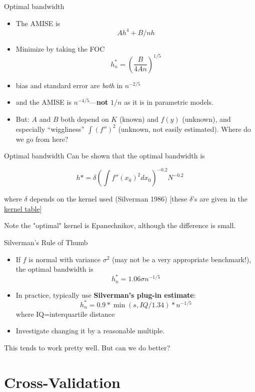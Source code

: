\begin{frame}{Optimal bandwidth}
  \begin{itemize}
  \item The AMISE is $$Ah^4+B/nh$$
  \item Minimize by taking the FOC 
    $$h^*_n=\left(\frac{B}{4An}\right)^{1/5}$$
  
  \item bias and standard error are \emph{both} in $n^{-2/5}$
  \item and the AMISE is $n^{-4/5}$---{\bf not} $1/n$ as it is in parametric models.
  
  \item But: $A$ and $B$ both depend on $K$ (known) and $f(y)$ (unknown), and
  especially ``wiggliness''
  $\int (f'')^2$ (unknown, not easily estimated). Where do we go from here? 
  \end{itemize}
\end{frame}

\begin{frame}{Optimal bandwidth}
  Can be shown that the optimal bandwidth is 
  
  $$h* = \delta \left( \int f''(x_0)^2dx_0\right)^{-0.2}N^{-0.2} $$

  where $\delta$ depends on the kernel used (Silverman 1986) [these $\delta$'s are given in the \href{fig:kernels}{kernel table}]

  Note the "optimal" kernel is Epanechnikov, although the difference is small. 

\end{frame}

\begin{frame}{Silverman's Rule of Thumb}
  \begin{itemize}
  \item If $f$ is normal with variance $\sigma^2$ (may not be a very appropriate benchmark!), the optimal bandwidth
  is
  $$h^*_n=1.06 \sigma n^{-1/5}$$
  \item In practice, typically use \textbf{Silverman's plug-in estimate}:
  $$h^*_n=0.9*\min(s,IQ/1.34)*n^{-1/5}$$ 
  where IQ=interquartile distance
  \item Investigate changing it by a reasonable multiple.
  \end{itemize}
\pause
  This tends to work pretty well. But can we do better? 
\end{frame}

\section{Cross-Validation}

